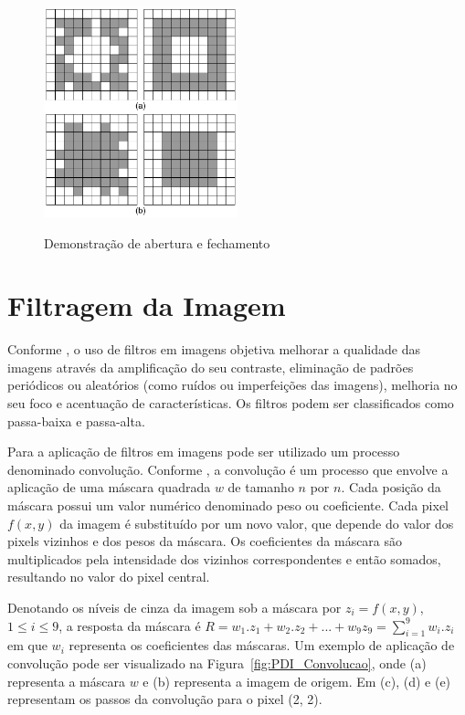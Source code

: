 \documentclass[12pt,oneside,a4paper,english,french,spanish,brazil,]{abntex2}
\begin{document}
\begin{figure}[ht]
\centering
\caption{Demonstração de abertura e fechamento}
\includegraphics[width=0.5\textwidth]{imagens/PDI_Abertura_Fechamento_1.pdf}
\sourceAuthor
\label{fig:PDI_Abertura_Fechamento_1}
\end{figure}

\section{Filtragem da Imagem}

Conforme \citet{conci:2003}, o uso de filtros em imagens objetiva melhorar a qualidade das imagens através da amplificação do seu contraste, eliminação de padrões periódicos ou aleatórios (como ruídos ou imperfeições das imagens), melhoria no seu foco e acentuação de características. Os filtros podem ser classificados como passa-baixa e passa-alta.
	
Para a aplicação de filtros em imagens pode ser utilizado um processo denominado convolução. Conforme \cite{pedrini:2008}, a convolução é um processo que envolve a aplicação de uma máscara quadrada \(w\) de tamanho \(n\) por \(n\). Cada posição da máscara possui um valor numérico denominado peso ou coeficiente. Cada pixel \(f(x,y)\) da imagem é substituído por um novo valor, que depende do valor dos pixels vizinhos e dos pesos da máscara. Os coeficientes da máscara são multiplicados pela intensidade dos vizinhos correspondentes e então somados, resultando no valor do pixel central.

Denotando os níveis de cinza da imagem sob a máscara por \(z_i=f(x,y)\), \(1\leq i\leq 9\), a resposta da máscara é \(R=w_1.z_1+w_2.z_2+...+w_9z_9 = \sum_{i=1}^{9}w_i.z_i\) em que \(w_i\) representa os coeficientes das máscaras. Um exemplo de aplicação de convolução pode ser visualizado na Figura~\ref{fig:PDI_Convolucao}, onde (a) representa a máscara \(w\) e (b) representa a imagem de origem. Em (c), (d) e (e) representam os passos da convolução para o pixel (2, 2).
	
\end{document}
